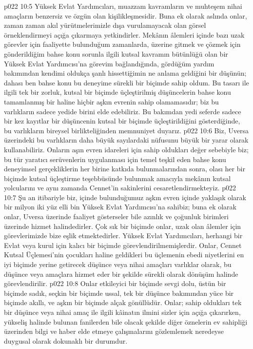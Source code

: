 \vs p022 10:5 Yüksek Evlat Yardımcıları, muazzam kavramların ve muhteşem nihai amaçların benzersiz ve özgün olan kişilikleşmesidir. Buna ek olarak aslında onlar, zaman zaman akıl yürütmelerimizle dışa vurulamayacak olan görsel örneklendirmeyi açığa çıkarmaya yetkindirler. Mekânın âlemleri içinde bazı uzak görevler için faaliyette bulunduğum zamanlarda, üzerine gitmek ve çözmek için gönderildiğim bahse konu sorunla ilgili kutsal kavramın bütünlüğü olan bir Yüksek Evlat Yardımcısı’na görevim bağlandığında, gördüğüm yardım bakımından kendimi oldukça şanlı hissettiğimin ne anlama geldiğini bir düşünün; dahası ben bahse konu bu deneyime sürekli bir biçimde sahip oldum. Bu tasarı ile ilgili tek bir zorluk, kutsal bir biçimde üçleştirilmiş düşüncelerin bahse konu tamamlanmış bir haline hiçbir aşkın evrenin sahip olamamasıdır; biz bu varlıkların sadece yedide birini elde edebiliriz. Bu bakımdan yedi seferde sadece bir kez kayıtlar bir düşüncenin kutsal bir biçimde üçleştirildiğini gösterdiğinde, bu varlıkların bireysel birlikteliğinden memnuniyet duyarız.
\vs p022 10:6 Biz, Uversa üzerindeki bu varlıkların daha büyük sayılardaki nüfusunu büyük bir yarar olarak kullanabiliriz. Onların aşın evren idareleri için sahip oldukları değer sebebiyle biz; bu tür yaratıcı serüvenlerin uygulanması için temel teşkil eden bahse konu deneyimsel gerçekliklerin her birine katkıda bulunmalarından sonra, olası her bir biçimde kutsal üçleştirme teşebbüsünde bulunmak amacıyla mekânın kutsal yolcularını ve aynı zamanda Cennet’in sakinlerini cesaretlendirmekteyiz.
\vs p022 10:7 Şu an itibariyle biz, içinde bulunduğumuz aşkın evren içinde yaklaşık olarak bir milyon iki yüz elli bin Yüksek Evlat Yardımcısı’na sahibiz; buna ek olarak onlar, Uversa üzerinde faaliyet gösterseler bile azınlık ve çoğunluk birimleri üzerinde hizmet halindedirler. Çok sık bir biçimde onlar, uzak olan âlemler için görevlerimizde bize eşlik etmektedirler. Yüksek Evlat Yardımcıları, herhangi bir Evlat veya kurul için kalıcı bir biçimde görevlendirilmemişlerdir. Onlar, Cennet Kutsal Üçlemesi’nin çocukları haline geldikleri bu üçlemenin ebedi niyetlerini en iyi biçimde yerine getirecek düşünce veya nihai amaçları  varlıklar olarak, bu düşünce veya amaçlara hizmet eder bir şekilde sürekli olarak dönüşüm halinde görevlendirilir.
\vs p022 10:8 Onlar etkileyici bir biçimde sevgi dolu, üstün bir biçimde sadık, seçkin bir biçimde ussal, tek bir düşünce bakımından yüce bir biçimde akıllı, ve aşkın bir biçimde alçak gönüllüdür. Onlar; sahip oldukları tek bir düşünce veya nihai amaç ile ilgili kâinatın ilmini sizler için açığa çıkarırken, yükseliş halinde bulunan fanilerden bile olacak şekilde diğer öznelerin ev sahipliği üzerinden bilgi ve haber elde etmeye çalışmalarını gözlemlemek neredeyse duygusal olarak dokunaklı bir durumdur.
